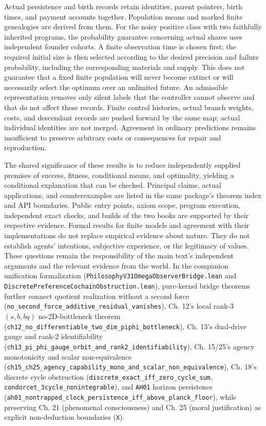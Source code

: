 \documentclass[
  english,
  11pt,
  oneside]{book}
\begin{document}
Actual persistence and birth records retain identities, parent pointers, birth times, and payment accounts together. Population means and marked finite genealogies are derived from them. For the noisy positive class with two faithfully inherited programs, the probability guarantee concerning actual shares uses independent founder cohorts. A finite observation time is chosen first; the required initial size is then selected according to the desired precision and failure probability, including the corresponding materials and supply. This does not guarantee that a fixed finite population will never become extinct or will necessarily select the optimum over an unlimited future. An admissible representation removes only silent labels that the controller cannot observe and that do not affect these records. Finite control histories, actual branch weights, costs, and descendant records are pushed forward by the same map; actual individual identities are not merged. Agreement in ordinary predictions remains insufficient to preserve arbitrary costs or consequences for repair and reproduction.

The shared significance of these results is to reduce independently supplied premises of success, fitness, conditional means, and optimality, yielding a conditional explanation that can be checked. Principal claims, actual applications, and counterexamples are listed in the same package's theorem index and API boundaries. Public entry points, axiom scope, program execution, independent exact checks, and builds of the two books are supported by their respective evidence. Formal results for finite models and agreement with their implementations do not replace empirical evidence about nature. They do not establish agents' intentions, subjective experience, or the legitimacy of values. These questions remain the responsibility of the main text's independent arguments and the relevant evidence from the world. In the companion unification formalization (\nolinkurl{PhilosophyV31OmegaObserverBridge.lean} and \nolinkurl{DiscretePreferenceCochainObstruction.lean}), pure-kernel bridge theorems further connect quotient realization without a second force (\nolinkurl{no_second_force_additive_residual_vanishes}), Ch. 12's local rank-3 \((s,b,bq)\) no-2D-bottleneck theorem (\nolinkurl{ch12_no_differentiable_two_dim_piphi_bottleneck}), Ch. 13's dual-drive gauge and rank-2 identifiability (\nolinkurl{ch13_pi_phi_gauge_orbit_and_rank2_identifiability}), Ch. 15/25's agency monotonicity and scalar non-equivalence (\nolinkurl{ch15_ch25_agency_capability_mono_and_scalar_non_equivalence}), Ch. 18's discrete cycle obstruction (\nolinkurl{discrete_exact_iff_zero_cycle_sum}, \nolinkurl{condorcet_3cycle_nonintegrable}), and \texttt{AH01} horizon persistence (\nolinkurl{ah01_nontrapped_clock_persistence_iff_above_planck_floor}), while preserving Ch. 21 (phenomenal consciousness) and Ch. 25 (moral justification) as explicit non-deduction boundaries (\texttt{X}).
\end{document}
